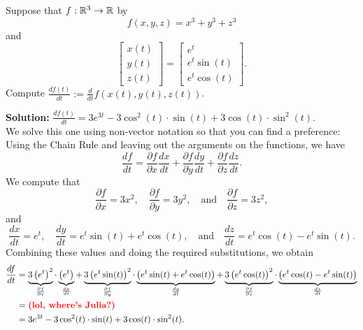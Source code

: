 \bigskip

\begin{example}  Suppose that $f:\mathbb R^3 \to \mathbb R$ by
$$f(x, y, z) = x^3 + y^3 + z^3$$
and 
$$\left[
\begin{array}{c}
x(t) \\
y(t) \\
z(t)
\end{array}
\right] = \left[
\begin{array}{c}
e^t\\
e^t \sin(t) \\
e^t \cos(t)
\end{array}
\right]. $$
Compute $\frac{df(t)}{dt} := \frac{d}{dt} f(x(t), y(t), z(t))$.
\end{example}

\textbf{Solution:} $\frac{df(t)}{dt} = 3e^{3t} - 3\cos^2(t) \cdot \sin(t) + 3\cos(t)  \cdot \sin^2(t)$.\\

We solve this one using non-vector notation so that you can find a preference: Using the Chain Rule and leaving out the arguments on the functions, we have
\[
\frac{df}{dt} = \frac{\partial f}{\partial x} \frac{dx}{dt} + \frac{\partial f}{\partial y} \frac{dy}{dt} + \frac{\partial f}{\partial z} \frac{dz}{dt}.
\]
We compute that
\[
\frac{\partial f}{\partial x} = 3x^2, \quad \frac{\partial f}{\partial y} = 3y^2, \quad \text{and} \quad \frac{\partial f}{\partial z} = 3z^2,
\]
and
\[
\frac{dx}{dt} = e^t, \quad \frac{dy}{dt} =  e^t \sin(t) + e^t \cos(t) , \quad \text{and} \quad \frac{dz}{dt} =e^t \cos(t) - e^t \sin(t).
\]
Combining these values and doing the required substitutions, we obtain
\begin{align*}
    \frac{df}{dt} &= \underbrace{3\left(e^t \right)^2}_{\frac{\partial f}{\partial x}} \cdot \underbrace{\left(e^t \right)}_{\frac{dx}{dt}} + \underbrace{3\left(e^t\sin(t)\right)^2}_{\frac{\partial f}{\partial y}} \cdot \underbrace{\left(  e^t\sin(t) + e^t\cos(t) \right)}_{\frac{dy}{dt}} + \underbrace{3 \left(e^t\cos(t) \right)^2}_{\frac{\partial f}{\partial z}} \cdot \underbrace{\left( e^t\cos(t) -e^t\sin(t)\right)}_{\frac{dz}{dt}}\\
    & = \textcolor{red}{\text{\bf (lol, where's Julia?)}}\\
    & = 3e^{3t} - 3\cos^2(t) \cdot \sin(t) + 3\cos(t)  \cdot \sin^2(t).
\end{align*}


